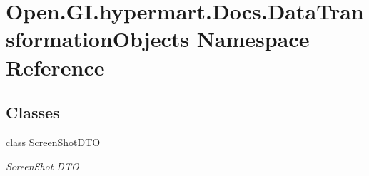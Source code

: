 \hypertarget{namespace_open_1_1_g_i_1_1hypermart_1_1_docs_1_1_data_transformation_objects}{}\section{Open.\+G\+I.\+hypermart.\+Docs.\+Data\+Transformation\+Objects Namespace Reference}
\label{namespace_open_1_1_g_i_1_1hypermart_1_1_docs_1_1_data_transformation_objects}
\subsection*{Classes}
\begin{DoxyCompactItemize}
\item 
class \hyperlink{class_open_1_1_g_i_1_1hypermart_1_1_docs_1_1_data_transformation_objects_1_1_screen_shot_d_t_o}{Screen\+Shot\+D\+TO}
\begin{DoxyCompactList}\small\item\em Screen\+Shot D\+TO \end{DoxyCompactList}\end{DoxyCompactItemize}
